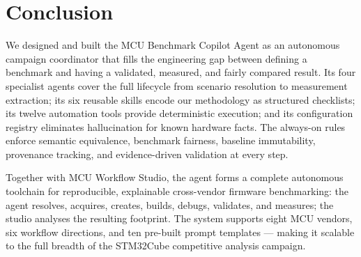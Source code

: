 \section*{Conclusion}

We designed and built the MCU Benchmark Copilot Agent as an autonomous campaign coordinator
that fills the engineering gap between defining a benchmark and having a validated,
measured, and fairly compared result. Its four specialist agents cover the full lifecycle
from scenario resolution to measurement extraction; its six reusable skills encode our
methodology as structured checklists; its twelve automation tools provide deterministic
execution; and its configuration registry eliminates hallucination for known hardware facts.
The always-on rules enforce semantic equivalence, benchmark fairness, baseline immutability,
provenance tracking, and evidence-driven validation at every step.

Together with MCU Workflow Studio, the agent forms a complete autonomous toolchain for
reproducible, explainable cross-vendor firmware benchmarking: the agent resolves, acquires,
creates, builds, debugs, validates, and measures; the studio analyses the resulting
footprint. The system supports eight MCU vendors, six workflow directions, and ten
pre-built prompt templates --- making it scalable to the full breadth of the STM32Cube
competitive analysis campaign.

\pagebreak